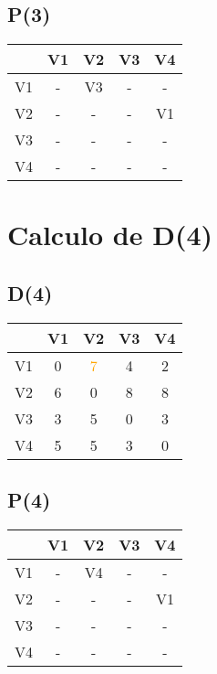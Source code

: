 \documentclass[a4paper,11pt]{article}
\begin{document}
\subsection*{P(3)}
\begin{center}
\begin{tabular}{c|cccc}
 & V1 & V2 & V3 & V4 \\ \hline
V1 & - & V3 & - & - \\
V2 & - & - & - & V1 \\
V3 & - & - & - & - \\
V4 & - & - & - & - \\
\end{tabular}
\end{center}
\newpage
\section*{Calculo de D(4)}
\subsection*{D(4)}
\begin{center}
\begin{tabular}{c|cccc}
 & V1 & V2 & V3 & V4 \\ \hline
V1 & 0 & \textcolor{orange}{7} & 4 & 2 \\
V2 & 6 & 0 & 8 & 8 \\
V3 & 3 & 5 & 0 & 3 \\
V4 & 5 & 5 & 3 & 0 \\
\end{tabular}
\end{center}
\subsection*{P(4)}
\begin{center}
\begin{tabular}{c|cccc}
 & V1 & V2 & V3 & V4 \\ \hline
V1 & - & V4 & - & - \\
V2 & - & - & - & V1 \\
V3 & - & - & - & - \\
V4 & - & - & - & - \\
\end{tabular}
\end{center}
\newpage
\end{document}
